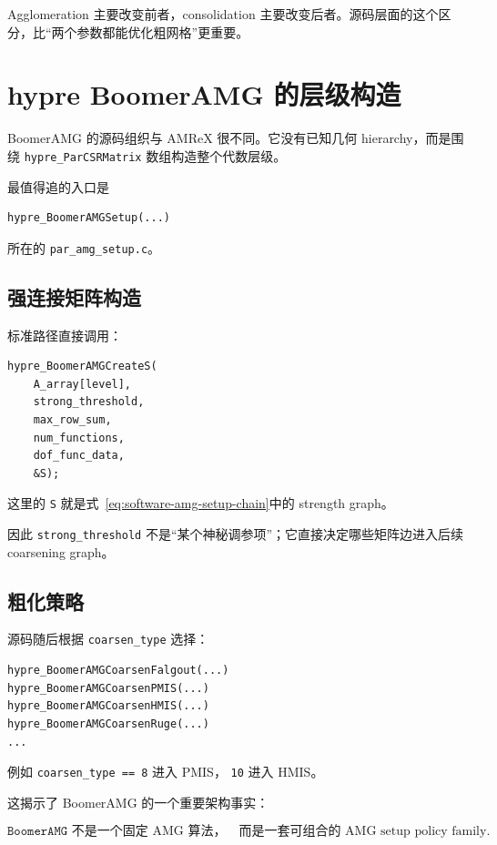 Agglomeration 主要改变前者，consolidation 主要改变后者。源码层面的这个区分，比“两个参数都能优化粗网格”更重要。

\section{hypre BoomerAMG 的层级构造}
\label{sec:software-hypre-source}

BoomerAMG 的源码组织与 AMReX 很不同。它没有已知几何 hierarchy，而是围绕
\texttt{hypre\_ParCSRMatrix} 数组构造整个代数层级。

最值得追的入口是
\begin{verbatim}
hypre_BoomerAMGSetup(...)
\end{verbatim}
所在的 \texttt{par\_amg\_setup.c}。

\subsection{强连接矩阵构造}

标准路径直接调用：

\begin{verbatim}
hypre_BoomerAMGCreateS(
    A_array[level],
    strong_threshold,
    max_row_sum,
    num_functions,
    dof_func_data,
    &S);
\end{verbatim}

这里的 \texttt{S} 就是式~\eqref{eq:software-amg-setup-chain}中的 strength graph。

因此 \texttt{strong\_threshold} 不是“某个神秘调参项”；它直接决定哪些矩阵边进入后续 coarsening graph。

\subsection{粗化策略}

源码随后根据 \texttt{coarsen\_type} 选择：

\begin{verbatim}
hypre_BoomerAMGCoarsenFalgout(...)
hypre_BoomerAMGCoarsenPMIS(...)
hypre_BoomerAMGCoarsenHMIS(...)
hypre_BoomerAMGCoarsenRuge(...)
...
\end{verbatim}

例如 \texttt{coarsen\_type == 8} 进入 PMIS，
\texttt{10} 进入 HMIS。

这揭示了 BoomerAMG 的一个重要架构事实：

\begin{equation}
\boxed{
\texttt{BoomerAMG}
\text{ 不是一个固定 AMG 算法，}
\quad
\text{而是一套可组合的 AMG setup policy family}.
}
\end{equation}

